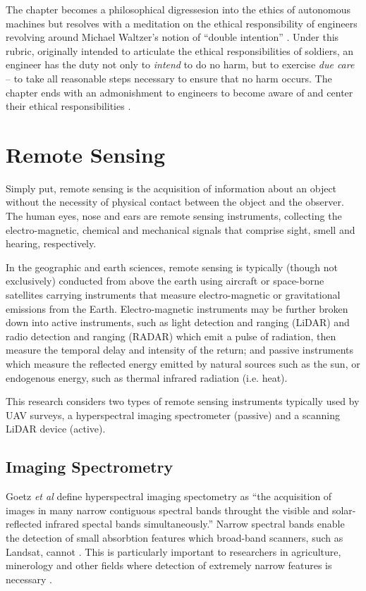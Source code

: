 \documentclass[10pt]{article}
\begin{document}
The chapter becomes a philosophical digressesion into the ethics of autonomous machines but resolves with a meditation on the ethical responsibility of engineers \cite[p.2873]{Valavanis2015bz} revolving around Michael Waltzer's notion of ``double intention'' \cite{Waltzer}. Under this rubric, originally intended to articulate the ethical responsibilities of soldiers, an engineer has the duty not only to \emph{intend} to do no harm, but to exercise \emph{due care} \cite{Lucas2011} -- to take all reasonable steps necessary to ensure that no harm occurs. The chapter ends with an admonishment to engineers to become aware of and center their ethical responsibilities \cite[p.2974]{Valavanis2015bz}.

\section{Remote Sensing}

Simply put, remote sensing is the acquisition of information about an object without the necessity of physical contact between the object and the observer. The human eyes, nose and ears are remote sensing instruments, collecting the electro-magnetic, chemical and mechanical signals that comprise sight, smell and hearing, respectively.

In the geographic and earth sciences, remote sensing is typically (though not exclusively) conducted from above the earth using aircraft or space-borne satellites carrying instruments that measure electro-magnetic or gravitational emissions from the Earth. Electro-magnetic instruments may be further broken down into active instruments, such as light detection and ranging (LiDAR) and radio detection and ranging (RADAR) which emit a pulse of radiation, then measure the temporal delay and intensity of the return; and passive instruments which measure the reflected energy emitted by natural sources such as the sun, or endogenous energy, such as thermal infrared radiation (i.e. heat).

This research considers two types of remote sensing instruments typically used by UAV surveys, a hyperspectral imaging spectrometer (passive) and a scanning LiDAR device (active). 

\subsection{Imaging Spectrometry}

Goetz \emph{et al} \cite{Goetz1985} define hyperspectral imaging spectometry as ``the acquisition of images in many narrow contiguous spectral bands throught the visible and solar-reflected infrared spectal bands simultaneously.'' Narrow spectral bands enable the detection of small absorbtion features which broad-band scanners, such as Landsat, cannot \cite{Geotz1985}. This is particularly important to researchers in agriculture, minerology and other fields where detection of extremely narrow features is necessary \cite{Goetz1985}.
\end{document}
